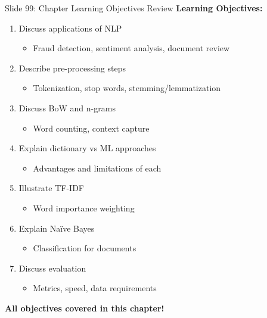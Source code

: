 \documentclass[8pt]{beamer}
\begin{document}
	\begin{frame}{Slide 99: Chapter Learning Objectives Review}
		\fontsize{6.5}{7.5}\selectfont
		\textbf{Learning Objectives:}
		\begin{enumerate}
			\item Discuss applications of NLP
			\begin{itemize}
				\item Fraud detection, sentiment analysis, document review
			\end{itemize}
			\item Describe pre-processing steps
			\begin{itemize}
				\item Tokenization, stop words, stemming/lemmatization
			\end{itemize}
			\item Discuss BoW and n-grams
			\begin{itemize}
				\item Word counting, context capture
			\end{itemize}
			\item Explain dictionary vs ML approaches
			\begin{itemize}
				\item Advantages and limitations of each
			\end{itemize}
			\item Illustrate TF-IDF
			\begin{itemize}
				\item Word importance weighting
			\end{itemize}
			\item Explain Naïve Bayes
			\begin{itemize}
				\item Classification for documents
			\end{itemize}
			\item Discuss evaluation
			\begin{itemize}
				\item Metrics, speed, data requirements
			\end{itemize}
		\end{enumerate}
		
		\textcolor{myblue}{\textbf{All objectives covered in this chapter!}}
	\end{frame}
	
\end{document}
